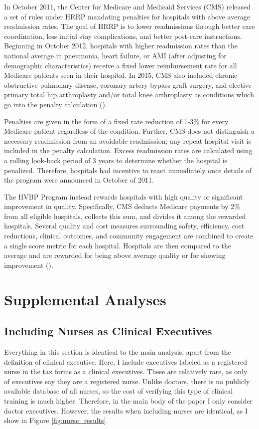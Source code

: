 \documentclass[12pt]{article}
\begin{document}
In October 2011, the Center for Medicare and Medicaid Services (CMS) released a set of rules under HRRP mandating penalties for hospitals with above average readmission rates. The goal of HRRP is to lower readmissions through better care coordination, less initial stay complications, and better post-care instructions. Beginning in October 2012, hospitals with higher readmission rates than the national average in pneumonia, heart failure, or AMI (after adjusting for demographic characteristics) receive a fixed lower reimbursement rate for all Medicare patients seen in their hospital. In 2015, CMS also included chronic obstructive pulmonary disease, coronary artery bypass graft surgery, and elective primary total hip arthroplasty and/or total knee arthroplasty as conditions which go into the penalty calculation (\cite{CMS}). 
    
    Penalties are given in the form of a fixed rate reduction of 1-3\% for every Medicare patient regardless of the condition. Further, CMS does not distinguish a necessary readmission from an avoidable readmission; any repeat hospital visit is included in the penalty calculation. Excess readmission rates are calculated using a rolling look-back period of 3 years to determine whether the hospital is penalized. Therefore, hospitals had incentive to react immediately once details of the program were announced in October of 2011. 

    The HVBP Program instead rewards hospitals with high quality or significant improvement in quality. Specifically, CMS deducts Medicare payments by 2\% from all eligible hospitals, collects this sum, and divides it among the rewarded hospitals. Several quality and cost measures surrounding safety, efficiency, cost reductions, clinical outcomes, and community engagement are combined to create a single score metric for each hospital. Hospitals are then compared to the average and are rewarded for being above average quality or for showing improvement (\cite{CMS_2023}). 

    \section{Supplemental Analyses}

    \subsection{Including Nurses as Clinical Executives}\label{app:nurses}

    Everything in this section is identical to the main analysis, apart from the definition of clinical executive. Here, I include executives labeled as a registered nurse in the tax forms as a clinical executives. These are relatively rare, as only of executives say they are a registered nurse. Unlike doctors, there is no publicly available database of all nurses, so the cost of verifying this type of clinical training is much higher. Therefore, in the main body of the paper I only consider doctor executives. However, the results when including nurses are identical, as I show in Figure \ref{fig:nurse_results}. 
\end{document}
